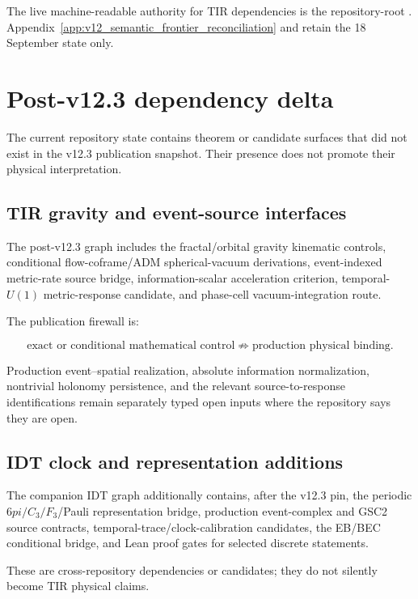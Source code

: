 \documentclass[11pt,a4paper,twoside]{book}
\def\pi{pi}%
\theoremstyle{definition}
\begin{document}
The live machine-readable authority for TIR dependencies is the repository-root
. Appendix~\ref{app:v12_semantic_frontier_reconciliation}
and  retain the 18 September state only.

\section{Post-v12.3 dependency delta}

The current repository state contains theorem or candidate surfaces that did not exist in
the v12.3 publication snapshot. Their presence does not promote their physical interpretation.

\subsection{TIR gravity and event-source interfaces}

The post-v12.3 graph includes the fractal/orbital gravity kinematic controls, conditional
flow-coframe/ADM spherical-vacuum derivations, event-indexed metric-rate source bridge,
information-scalar acceleration criterion, temporal-$U(1)$ metric-response candidate, and
phase-cell vacuum-integration route.

The publication firewall is:

\[
\boxed{
\text{exact or conditional mathematical control}
\not\Rightarrow
\text{production physical binding}.
}
\]

Production event--spatial realization, absolute information normalization, nontrivial
holonomy persistence, and the relevant source-to-response identifications remain separately
typed open inputs where the repository says they are open.

\subsection{IDT clock and representation additions}

The companion IDT graph additionally contains, after the v12.3 pin, the periodic
$6\pi/C_3/F_3$/Pauli representation bridge, production event-complex and GSC2 source
contracts, temporal-trace/clock-calibration candidates, the EB/BEC conditional bridge,
and Lean proof gates for selected discrete statements.

These are cross-repository dependencies or candidates; they do not silently become TIR
physical claims.
\end{document}
